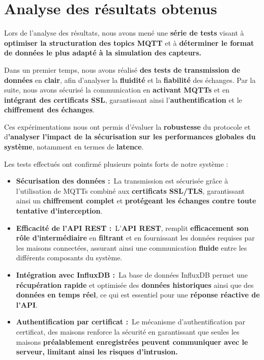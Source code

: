 \documentclass[10pt, a4paper]{report}
\begin{document}
	\section{Analyse des résultats obtenus}
	
	Lors de l’analyse des résultats, nous avons mené une\textbf{ série de tests} visant à \textbf{optimiser la structuration des topics MQTT} et à \textbf{déterminer le format de données le plus adapté à la simulation des capteurs.}
	
	Dans un premier temps, nous avons réalisé \textbf{des tests de transmission de données} en \textbf{clair}, afin d’analyser la \textbf{fluidité} et la \textbf{fiabilité} des échanges. Par la suite, nous avons sécurisé la communication en \textbf{activant MQTTs} et en \textbf{intégrant des certificats SSL}, garantissant ainsi l’\textbf{authentification} et le \textbf{chiffrement des échanges}.
	
	Ces expérimentations nous ont permis d’évaluer la \textbf{robustesse} du protocole et d\textbf{’analyser l'impact de la sécurisation sur les performances globales du système}, notamment en termes de \textbf{latence}.
	
	Les tests effectués ont confirmé plusieurs points forts de notre système : 
	\begin{itemize}
		\item  \textbf{Sécurisation des données :} La transmission est sécurisée grâce à l'utilisation de MQTTs combiné aux \textbf{certificats SSL/TLS}, garantissant ainsi un \textbf{chiffrement complet} et \textbf{protégeant les échanges contre toute tentative d'interception}.  
		\item  \textbf{Efficacité de l’API REST :} L’\textbf{API REST}, remplit \textbf{efficacement son rôle d'intermédiaire} en \textbf{filtrant} et en fournissant les données requises par les maisons connectées, assurant ainsi une communication \textbf{fluide} entre les différents composants du système.  
		\item  \textbf{Intégration avec InfluxDB :} La base de données InfluxDB permet une \textbf{récupération rapide} et optimisée des \textbf{données historiques} ainsi que des\textbf{ données en temps réel}, ce qui est essentiel pour une \textbf{réponse réactive de l'API}.  
		\item  \textbf{Authentification par certificat :} Le mécanisme d'authentification par certificat, des maisons renforce la sécurité en garantissant que seules les maisons \textbf{préalablement enregistrées peuvent communiquer avec le serveur, limitant ainsi les risques d'intrusion.}
	\end{itemize} 
\end{document}
